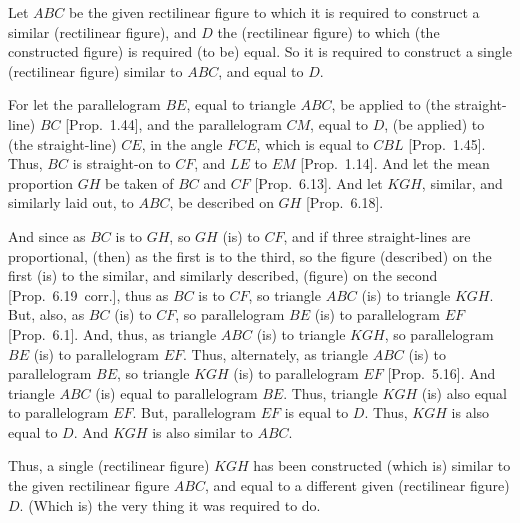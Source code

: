 \begin{Parallel}{}{}
{\epsfysize=1.35in
\centerline{}

Let $ABC$ be the given rectilinear figure to which it is required to construct
a similar (rectilinear figure), and $D$ the (rectilinear figure) to which (the constructed figure) is required (to be) equal. So it is required to
construct a single (rectilinear figure) similar to $ABC$, and equal to $D$.

For  let the parallelogram $BE$, equal to triangle $ABC$, be applied to
(the straight-line) $BC$  [Prop.~1.44], and the parallelogram $CM$, equal to $D$, (be applied) to (the straight-line) $CE$,  in the angle $FCE$, which is equal to $CBL$  [Prop.~1.45]. Thus, $BC$ is
straight-on to $CF$, and $LE$ to $EM$ [Prop.~1.14]. And let the mean proportion $GH$ 
be taken of $BC$ and $CF$  [Prop.~6.13].
And let $KGH$, similar, and similarly laid out, to  $ABC$, be described
on $GH$ [Prop.~6.18].

And since as $BC$ is to $GH$, so $GH$ (is) to $CF$, and if three straight-lines are
proportional, (then) as the first is to the third, so the figure (described) on the first
(is) to the similar, and similarly described, (figure) on the second 
[Prop.~6.19~corr.],  thus as $BC$ is to
$CF$, so triangle $ABC$ (is) to triangle $KGH$. But, also, as $BC$ (is) to
$CF$, so parallelogram $BE$ (is) to parallelogram $EF$ [Prop.~6.1]. And, thus,  as triangle $ABC$ (is) to triangle $KGH$, so parallelogram $BE$ (is) to parallelogram $EF$. 
Thus, alternately, as triangle
$ABC$ (is) to parallelogram $BE$, so triangle $KGH$ (is) to
parallelogram $EF$ [Prop.~5.16]. 
And triangle $ABC$ (is) equal to parallelogram $BE$. Thus, triangle $KGH$
(is) also equal to parallelogram $EF$. But, parallelogram $EF$ is equal to $D$. 
Thus, $KGH$ is also equal to $D$. And $KGH$ is also similar to $ABC$.

Thus, a single (rectilinear figure) $KGH$ has been constructed (which is)
similar to the given rectilinear figure $ABC$, and equal to a different
given (rectilinear figure) $D$. (Which is) the very thing it was required to do.}
\end{Parallel}

